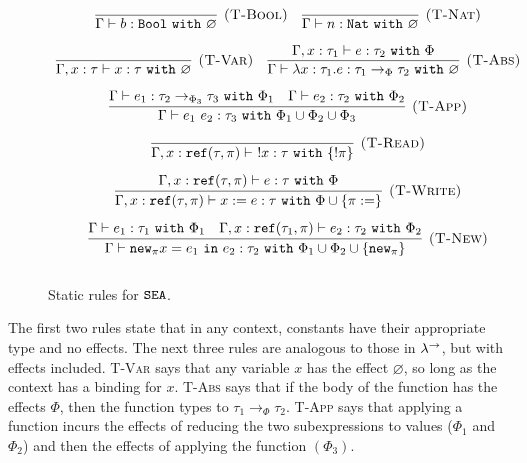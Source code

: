 \begin{figure}[h]


\[
\begin{array}{c}

\infer[\textsc{(T-Bool)}]
	{\Gamma \vdash b: \Bool ~\kw{with} \varnothing}
	{}
	~~~
\infer[\textsc{(T-Nat)}]
	{\Gamma \vdash n: \Nat ~\kw{with} \varnothing }
	{} \\[2ex]

\infer[\textsc{(T-Var)}]
	{\Gamma, x: \tau \vdash x: \tau~\kw{with} \varnothing}
	{}
	
~~~
	
\infer[\textsc{(T-Abs)}]
	{\Gamma \vdash \lambda x: \tau_1.e : \tau_1 \rightarrow_{\Phi} \tau_2~\kw{with} \varnothing}
	{\Gamma, x: \tau_1 \vdash e: \tau_2~\kw{with} \Phi} \\[2ex]
	
	
\infer[\textsc{(T-App)}]
	{\Gamma \vdash e_1~e_2: \tau_3~\kw{with} \Phi_1 \cup \Phi_2 \cup \Phi_3}
	{\Gamma \vdash e_1: \tau_2 \rightarrow_{\Phi_3} \tau_3~\kw{with} \Phi_1 & \Gamma \vdash e_2: \tau_2~\kw{with} \Phi_2} \\[2ex]

\infer[\textsc{(T-Read)}]
	{\Gamma, x: \reftype{\tau}{\pi} \vdash~!x : \tau~\kw{with} \{ !\pi \}}
	{} \\[2ex]
	
\infer[\textsc{(T-Write)}]
	{ \Gamma, x: \reftype{\tau}{\pi} \vdash x := e : \tau~\kw{with} \Phi \cup \{ \pi:=\} }
	{ \Gamma, x: \reftype{\tau}{\pi} \vdash e: \tau~\kw{with} \Phi } \\[2ex]

\infer[\textsc{(T-New)}]
	{ \Gamma \vdash \refnew{\pi}{x}{e_1}{e_2}: \tau_2~\kw{with} \Phi_1 \cup \Phi_2 \cup \{ \kwa{new}_{\pi} \} }
	{ \Gamma \vdash e_1: \tau_1~\kw{with} \Phi_1 & \Gamma, x: \reftype{\tau_1}{\pi} \vdash e_2: \tau_2~\kw{with} \Phi_2  } \\[2ex]

\end{array}
\]

\vspace{-12pt}
\caption{Static rules for $\mathtt{SEA}$.}
\label{fig:fxtute_static}
\end{figure}

The first two rules state that in any context, constants have their appropriate type and no effects. The next three rules are analogous to those in $\lambda^{\rightarrow}$, but with effects included. \textsc{T-Var} says that any variable $x$ has the effect $\varnothing$, so long as the context has a binding for $x$. \textsc{T-Abs} says that if the body of the function has the effects $\Phi$, then the function types to $\tau_1 \rightarrow_{\Phi} \tau_2$. \textsc{T-App} says that applying a function incurs the effects of reducing the two subexpressions to values ($\Phi_1$ and $\Phi_2$) and then the effects of applying the function $(\Phi_3)$.


